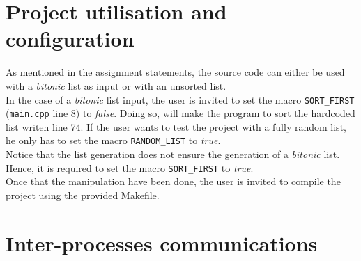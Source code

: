 \documentclass[a4paper,11pt]{article}
\begin{document}
\section{Project utilisation and configuration}

  As mentioned in the assignment statements, the source code can either be used with a \textit{bitonic} list as input or with an unsorted list.\\
  In the case of a \textit{bitonic} list input, the user is invited to set the macro \verb|SORT_FIRST| (\verb|main.cpp| line 8) to \textit{false}. Doing so, will make the program to sort the hardcoded list writen line 74. If the user wants to test the project with a fully random list, he only has to set the macro \verb|RANDOM_LIST| to \textit{true}.\\
  Notice that the list generation does not ensure the generation of a \textit{bitonic} list. Hence, it is required to set the macro \verb|SORT_FIRST| to \textit{true}.\\
  Once that the manipulation have been done, the user is invited to compile the project using the provided Makefile.

\section{Inter-processes communications}
\end{document}
